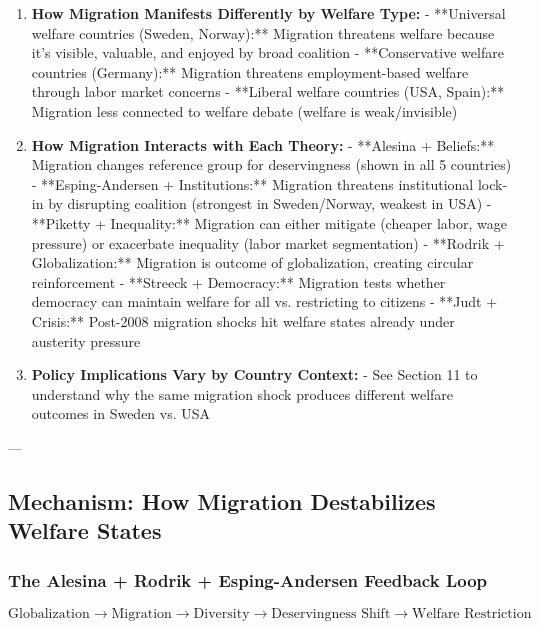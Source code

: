 \begin{enumerate}

\item \textbf{How Migration Manifests Differently by Welfare Type:}
   - **Universal welfare countries (Sweden, Norway):** Migration threatens welfare because it's visible, valuable, and enjoyed by broad coalition
   - **Conservative welfare countries (Germany):** Migration threatens employment-based welfare through labor market concerns
   - **Liberal welfare countries (USA, Spain):** Migration less connected to welfare debate (welfare is weak/invisible)

\item \textbf{How Migration Interacts with Each Theory:}
   - **Alesina + Beliefs:** Migration changes reference group for deservingness (shown in all 5 countries)
   - **Esping-Andersen + Institutions:** Migration threatens institutional lock-in by disrupting coalition (strongest in Sweden/Norway, weakest in USA)
   - **Piketty + Inequality:** Migration can either mitigate (cheaper labor, wage pressure) or exacerbate inequality (labor market segmentation)
   - **Rodrik + Globalization:** Migration is outcome of globalization, creating circular reinforcement
   - **Streeck + Democracy:** Migration tests whether democracy can maintain welfare for all vs. restricting to citizens
   - **Judt + Crisis:** Post-2008 migration shocks hit welfare states already under austerity pressure

\item \textbf{Policy Implications Vary by Country Context:}
   - See Section 11 to understand why the same migration shock produces different welfare outcomes in Sweden vs. USA

\end{enumerate}

---

\subsection{Mechanism: How Migration Destabilizes Welfare States}

\subsubsection{The Alesina + Rodrik + Esping-Andersen Feedback Loop}

\begin{equation}
\boxed{\text{Globalization} \to \text{Migration} \to \text{Diversity} \to \text{Deservingness Shift} \to \text{Welfare Restriction}}
\end{equation}

